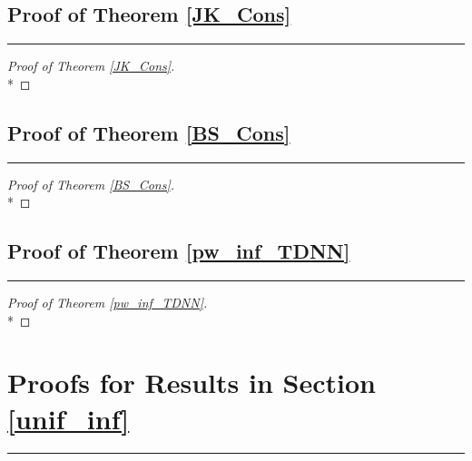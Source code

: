 \documentclass[letterpaper,10pt]{article}
\numberwithin{equation}{section}
\numberwithin{thm}{section}
\numberwithin{lem}{section}
\numberwithin{cor}{section}
\newcommand{\1}{\mathbbm{1}}
\begin{document}
\subsection{Proof of Theorem \ref{JK_Cons}}
\hrule

\begin{proof}[Proof of Theorem \ref{JK_Cons}]\mbox{}\\*

\end{proof}

\subsection{Proof of Theorem \ref{BS_Cons}}
\hrule

\begin{proof}[Proof of Theorem \ref{BS_Cons}]\mbox{}\\*

\end{proof}

\subsection{Proof of Theorem \ref{pw_inf_TDNN}}
\hrule

\begin{proof}[Proof of Theorem \ref{pw_inf_TDNN}]\mbox{}\\*

\end{proof}

\section{Proofs for Results in Section \ref{unif_inf}}
\hrule
\end{document}
